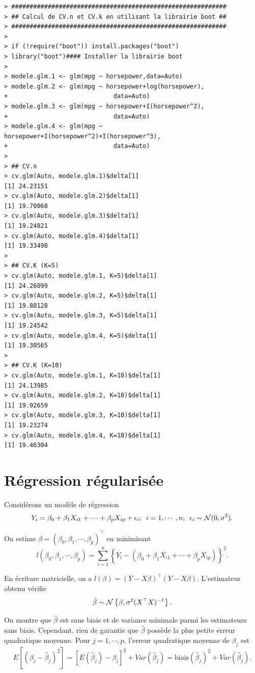 \documentclass[11pt]{article}
\begin{document}
\begin{verbatim}
> ###########################################################
> ## Calcul de CV.n et CV.k en utilisant la librairie boot ##
> ###########################################################
> 
> if (!require("boot")) install.packages("boot")
> library("boot")#### Installer la librairie boot
> 
> modele.glm.1 <- glm(mpg ~ horsepower,data=Auto)
> modele.glm.2 <- glm(mpg ~ horsepower+log(horsepower),
+                             data=Auto)
> modele.glm.3 <- glm(mpg ~ horsepower+I(horsepower^2),
+                             data=Auto)
> modele.glm.4 <- glm(mpg ~ horsepower+I(horsepower^2)+I(horsepower^3),
+                             data=Auto)
> 
> ## CV.n
> cv.glm(Auto, modele.glm.1)$delta[1]
[1] 24.23151
> cv.glm(Auto, modele.glm.2)$delta[1]
[1] 19.70068
> cv.glm(Auto, modele.glm.3)$delta[1]
[1] 19.24821
> cv.glm(Auto, modele.glm.4)$delta[1]
[1] 19.33498
> 
> ## CV.K (K=5)
> cv.glm(Auto, modele.glm.1, K=5)$delta[1]
[1] 24.26099
> cv.glm(Auto, modele.glm.2, K=5)$delta[1]
[1] 19.80128
> cv.glm(Auto, modele.glm.3, K=5)$delta[1]
[1] 19.24542
> cv.glm(Auto, modele.glm.4, K=5)$delta[1]
[1] 19.30565
> 
> ## CV.K (K=10)
> cv.glm(Auto, modele.glm.1, K=10)$delta[1]
[1] 24.13985
> cv.glm(Auto, modele.glm.2, K=10)$delta[1]
[1] 19.92659
> cv.glm(Auto, modele.glm.3, K=10)$delta[1]
[1] 19.23274
> cv.glm(Auto, modele.glm.4, K=10)$delta[1]
[1] 19.46304
\end{verbatim}

\section{R\'egression r\'egularis\'ee}

Consid\'erons un mod\`ele de r\'egression
$$Y_i = \beta_0 + \beta_1 X_{i1} + \cdots  + \beta_p X_{ip} + \epsilon_i; \, \, \, i=1,\cdots,n; \, \, \, \epsilon_i \sim {\cal N}(0,\sigma^2).$$

\noindent On estime $\beta=(\beta_0,\beta_1,\cdots,\beta_p)^\top$ en minimisant 
$$l(\beta_0,\beta_1,\cdots,\beta_p) = \sum_{i=1}^n \left\{Y_i - (\beta_0 + \beta_1 X_{i1} + \cdots  + \beta_p X_{ip})\right\}^2.$$

\noindent En \'ecriture matricielle, on a $l(\beta)=(Y-X\beta)^\top(Y-X\beta)$. L'estimateur obtenu v\'erifie $$\hat\beta \sim {\cal N}\left\{\beta,\sigma^2 (X^\top X)^{-1}\right\}.$$ 

\noindent On montre que $\hat\beta$ est sans biais et de variance minimale parmi les estimateurs sans biais. Cependant, rien de garantie que $\hat\beta$ poss\`ede la plus petite erreur quadratique moyenne. Pour $j=1,\cdots,p$, l'erreur quadratique moyenne de $\beta_j$ est $$E\left[(\beta_j-\hat\beta_j)^2\right]=\left[E(\hat\beta_j)-\beta_j\right]^2+Var(\hat\beta_j) = \mbox{biais}(\hat\beta_j)^2 + Var(\hat\beta_j).$$
\end{document}
